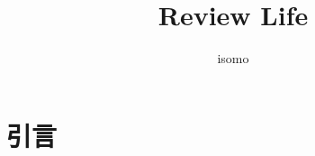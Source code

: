 \documentclass{article}
\title{Review Life}
\author{isomo}
\begin{document}
\maketitle

\section{引言}


% 
% 
\end{document}
